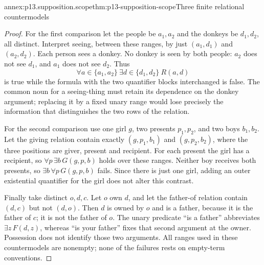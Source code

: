 \begin{annexitem}{annex:p13.supposition.scope}{thm:p13-supposition-scope}{Three finite relational countermodels}
\begin{proof}
For the first comparison let the people be \(a_1,a_2\) and the
donkeys be \(d_1,d_2\), all distinct. Interpret seeing, between these
ranges, by just \((a_1,d_1)\) and \((a_2,d_2)\). Each person sees a
donkey. No donkey is seen by both people: \(a_2\) does not see
\(d_1\), and \(a_1\) does not see \(d_2\). Thus
\[
 \forall a\in\{a_1,a_2\}\ \exists d\in\{d_1,d_2\}\ R(a,d)
\]
is true while the formula with the two quantifier blocks interchanged
is false. The common noun for a seeing-thing must retain its dependence
on the donkey argument; replacing it by a fixed unary range would lose
precisely the information that distinguishes the two rows of the relation.

For the second comparison use one girl \(g\), two presents
\(p_1,p_2\), and two boys \(b_1,b_2\). Let the giving relation
contain exactly \((g,p_1,b_1)\) and \((g,p_2,b_2)\), where the three
positions are giver, present and recipient. For each present the girl
has a recipient, so \(\forall p\,\exists b\,G(g,p,b)\) holds over
these ranges. Neither boy receives both presents, so
\(\exists b\,\forall p\,G(g,p,b)\) fails. Since there is just one
girl, adding an outer existential quantifier for the girl does not
alter this contrast.

Finally take distinct \(o,d,c\). Let \(o\) own \(d\), and let
the father-of relation contain \((d,c)\) but not \((d,o)\).
Then \(d\) is owned by \(o\) and is a father, because it is the
father of \(c\); it is not the father of \(o\). The unary predicate
``is a father'' abbreviates \(\exists z\,F(d,z)\), whereas
``is your father'' fixes that second argument at the owner. Possession
does not identify those two arguments. All ranges used in these
countermodels are nonempty; none of the failures rests on empty-term
conventions.
\end{proof}
\end{annexitem}


